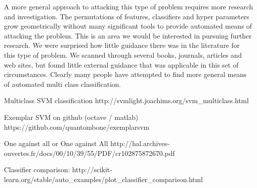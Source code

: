 \documentclass[11pt, oneside]{article}   	%
\begin{document}
A more general approach to attacking this type of problem requires more research and investigation. The permutations of features, classifiers and hyper parameters grow geometrically without many significant tools to provide automated means of attacking the problem. This is an area we would be interested in pursuing further research.
\clearpage
We were surprised how little guidance there was in the literature for this type of problem. We scanned through several books, journals, articles and web sites, but found little external guidance that was applicable in this set of circumstances. Clearly many people have attempted to find more general means of automated multi class classification.


\renewcommand{\refname}{Background Reading}

\begin{thebibliography}{1}

  Multiclass SVM classification http://svmlight.joachims.org/svm\_multiclass.html

  Exemplar SVM on github (octave / matlab)
  https://github.com/quantombone/exemplarsvm

  One against all or One against All
  http://hal.archives-ouvertes.fr/docs/00/10/39/55/PDF/cr102875872670.pdf

  Classifier comparison:
  http://scikit-learn.org/stable/auto\_examples/plot\_classifier\_comparison.html

  \end{thebibliography}
\end{document}
